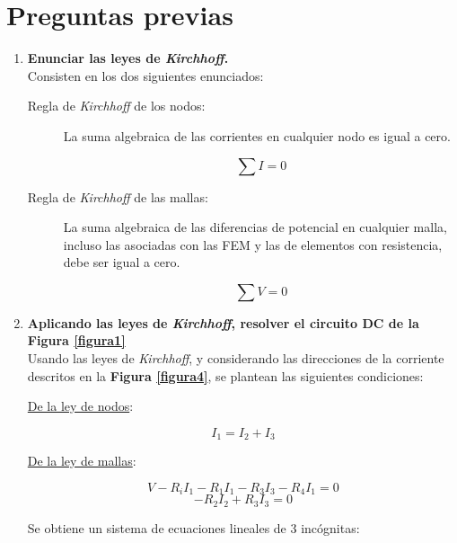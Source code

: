 \documentclass[letter,11pt]{article}
\begin{document}
\section{Preguntas previas}
\begin{enumerate}
\item \textbf{Enunciar las leyes de \emph{Kirchhoff}.} \\
Consisten en los dos siguientes enunciados:

\begin{description}
\item [Regla de \emph{Kirchhoff} de los nodos:]
La suma algebraica de las corrientes en cualquier nodo es igual a cero.

\begin{equation*}
    \sum I = 0
\end{equation*}

\item [Regla de \emph{Kirchhoff} de las mallas:]
La suma algebraica de las diferencias de potencial en cualquier malla, incluso
las asociadas con las FEM y las de elementos con resistencia, debe ser igual a
cero.

\begin{equation*}
    \sum V = 0
\end{equation*}

\end{description}

\item \textbf{Aplicando las leyes de \emph{Kirchhoff}, resolver el circuito DC
de la Figura \ref{figura1}} \\
Usando las leyes de \emph{Kirchhoff}, y considerando las direcciones de la
corriente descritos en la \textbf{Figura \ref{figura4}}, se plantean las
siguientes condiciones:

\underline{De la ley de nodos}:

\begin{equation*}
    I_1 = I_2 + I_3
\end{equation*}

\underline{De la ley de mallas}:

\begin{equation*}
    V - R_i I_1 - R_1 I_1 - R_3 I_3 - R_4 I_1 = 0
\end{equation*}
\begin{equation*}
    -R_2 I_2 + R_3 I_3 = 0
\end{equation*}

Se obtiene un sistema de ecuaciones lineales de 3 incógnitas:


\end{enumerate}
\end{document}
